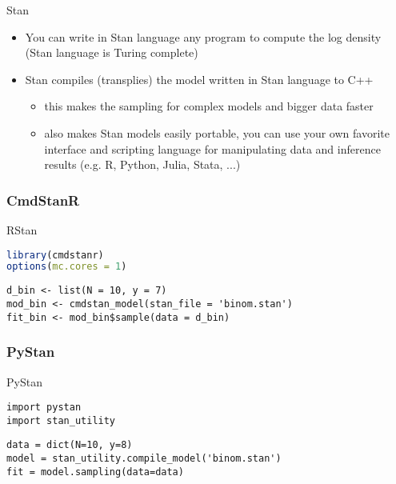 \documentclass[finnish,english,t]{beamer}
\begin{document}

    

\begin{frame}{Stan}
  
  \begin{itemize}
  \item You can write in Stan language any program to compute the
    log density (Stan language is Turing complete)
  \item<2-> Stan compiles (transplies) the model written in Stan language to C++
    \begin{itemize}
    \item this makes the sampling for complex models and bigger data faster
    \item also makes Stan models easily portable, you can use your own
      favorite interface and scripting language for manipulating data
      and inference results (e.g. R, Python, Julia, Stata, ...)
    \end{itemize}
  \end{itemize}

\end{frame}

\begin{frame}[fragile]
  \frametitle{CmdStanR}

  {\small\color{gray}
    {
      RStan
\begin{lstlisting}[language=R]
library(cmdstanr) 
options(mc.cores = 1)
\end{lstlisting}
    }
{
\begin{lstlisting}[]
d_bin <- list(N = 10, y = 7)
mod_bin <- cmdstan_model(stan_file = 'binom.stan')
fit_bin <- mod_bin$sample(data = d_bin)
\end{lstlisting}
}
}
\end{frame}

\begin{frame}[fragile]
  \frametitle{PyStan}

  {\small\color{gray}
{
      PyStan
\begin{lstlisting}
import pystan
import stan_utility
\end{lstlisting}
    }
    {
\begin{lstlisting}
data = dict(N=10, y=8)
model = stan_utility.compile_model('binom.stan')
fit = model.sampling(data=data)
\end{lstlisting}
    }
  }
\end{frame}
\end{document}
